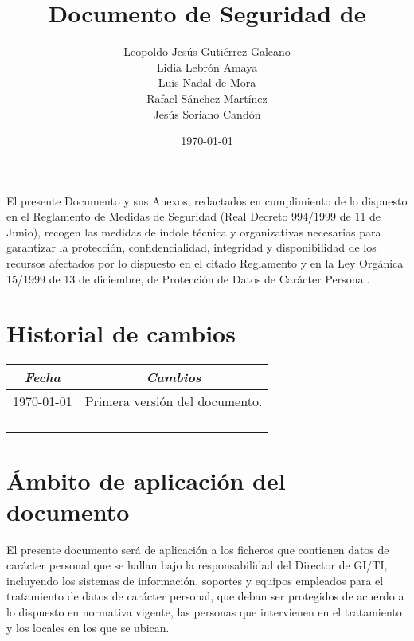 \documentclass[a4paper,11pt,bibtotoc,noliststotoc]{scrbook}
\title{Documento de Seguridad de \laorganizacion}
\author{Leopoldo Jesús Gutiérrez Galeano\\Lidia Lebrón Amaya\\Luis Nadal de Mora\\Rafael Sánchez Martínez\\Jesús Soriano Candón}
\date{\today}
\newcommand{\cellcenter}[1]{\multicolumn{1}{c}{#1}}
\newcommand{\thead}[1]{\textbf{\emph{#1}}}
\begin{document}
\begin{titlepage}
  \maketitle
\end{titlepage}

\frontmatter
\pagestyle{empty}

El presente Documento y sus Anexos, redactados en cumplimiento de lo dispuesto en el Reglamento de Medidas de Seguridad (Real Decreto 994/1999 de 11 de Junio), recogen las medidas de índole técnica y organizativas necesarias para garantizar la protección, confidencialidad, integridad y disponibilidad de los recursos afectados por lo dispuesto en el citado Reglamento y en la Ley Orgánica 15/1999 de 13 de diciembre, de Protección de Datos de Carácter Personal.


\tableofcontents
\listoffigures
\listoftables

\chapter{Historial de cambios}

\begin{center}
  \centering
  \begin{tabular}{|m{}|m{}|}
    \cellcenter{\thead{Fecha}} & \cellcenter{\thead{Cambios}} \\
    \hline
    \today & Primera versión del documento. \\ \hline
    &  \\ \hline
    &  \\ \hline
    &  \\ \hline
    &  \\ \hline
  \end{tabular}
\end{center}



\mainmatter
\pagestyle{scrheadings}




\chapter{Ámbito de aplicación del documento}

El presente documento será de aplicación a los ficheros que contienen datos de carácter personal que se hallan bajo la responsabilidad del Director de GI/TI, incluyendo los sistemas de información, soportes y equipos empleados para el tratamiento de datos de carácter personal, que deban ser protegidos de acuerdo a lo dispuesto en normativa vigente, las personas que intervienen en el tratamiento y los locales en los que se ubican.
\end{document}
